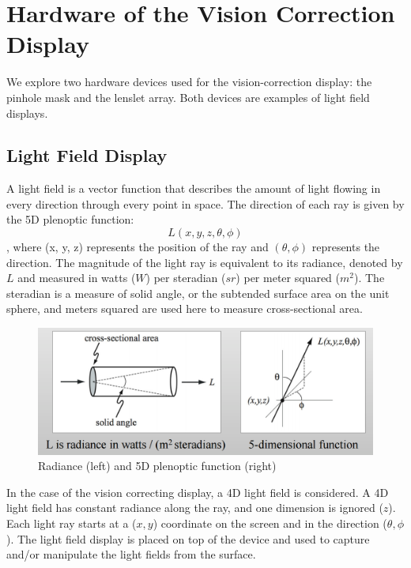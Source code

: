 \chapter{Hardware of the Vision Correction Display}

We explore two hardware devices used for the vision-correction display: the pinhole mask and the lenslet array. Both devices are examples of light field displays.

\section{Light Field Display}
A light field is a vector function that describes the amount of light flowing in every direction through every point in space. The direction of each ray is given by the 5D plenoptic function: $$L(x, y, z, \theta, \phi)$$, where (x, y, z) represents the position of the ray and $(\theta, \phi)$ represents the direction. The magnitude of the light ray is equivalent to its radiance, denoted by $L$ and measured in watts ($W$) per steradian ($sr$) per meter squared ($m^2$). The steradian is a measure of solid angle, or the subtended surface area on the unit sphere, and meters squared are used here to measure cross-sectional area.

\begin{figure}[ht]
  \centering
  \includegraphics[width=5in]{chapters/chapter3/images/light_field.png}
  \caption{Radiance (left) and 5D plenoptic function (right) \cite{Stanford}}
  \label{fig:plenoptic}
\end{figure}

In the case of the vision correcting display, a 4D light field is considered. A 4D light field has constant radiance along the ray, and one dimension is ignored ($z$). Each light ray starts at a ($x, y$) coordinate on the screen and in the direction ($\theta, \phi$). The light field display is placed on top of the device and used to capture and/or manipulate the light fields from the surface.


